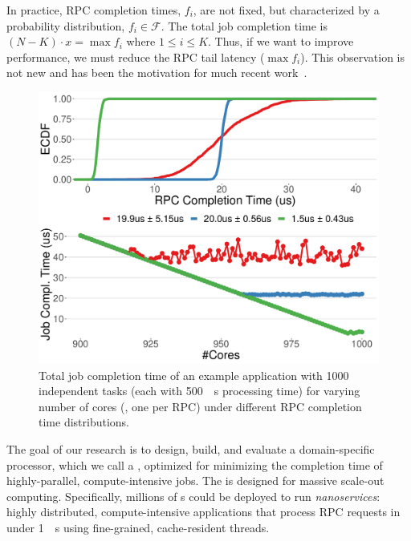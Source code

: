 In practice, RPC completion times, $f_i$, are not fixed, but characterized by a probability distribution, $f_i \in \mathcal{F}$. 
The total job completion time is $(N - K) \cdot x =\max{f_i}$ where $1\le i \le K$. Thus, if we want to improve performance, we must reduce the RPC tail latency ($\max{f_i}$). 
This observation is not new and has been the motivation for much recent work~\cite{shinjuku, shenango, rpcvalet}. 

\begin{figure}
  \includegraphics[width=0.9\linewidth]{./figures/nano-comptime}
  \caption{Total job completion time of an example application with 1000 independent tasks (each with \SI{500}{\mu s} processing time) for varying number of cores (\ie, one per RPC) under different RPC completion time distributions.}
  \label{fig:nanoservice-sim}
\end{figure}

The goal of our research is to design, build, and evaluate a domain-specific processor, which we call a {\em \name{}}, optimized for minimizing the completion time of highly-parallel, compute-intensive jobs. The \name{} is designed for massive scale-out computing. 
Specifically, millions of \name{}s could be deployed to run {\em nanoservices}: highly distributed, compute-intensive applications that process RPC requests in under \SI{1}{\mu s} using fine-grained, cache-resident threads.

